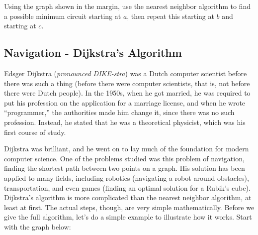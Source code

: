 \begin{trynolabel}
Using the graph shown in the margin, use the nearest neighbor algorithm to find a possible minimum circuit starting at $a$, then repeat this starting at $b$ and starting at $c$.
\end{trynolabel}
\pagebreak

\subsection{Navigation - Dijkstra's Algorithm}
Edsger Dijkstra (\emph{pronounced DIKE-stra}) was a Dutch computer scientist before there was such a thing (before there were computer scientists, that is, not before there were Dutch people).  In the 1950s, when he got married, he was required to put his profession on the application for a marriage license, and when he wrote ``programmer,'' the authorities made him change it, since there was no such profession.  Instead, he stated that he was a theoretical physicist, which was his first course of study.

Dijkstra was brilliant, and he went on to lay much of the foundation for modern computer science.  One of the problems studied was this problem of navigation, finding the shortest path between two points on a graph.  His solution has been applied to many fields, including robotics (navigating a robot around obstacles), transportation, and even games (finding an optimal solution for a Rubik's cube).\\

Dijkstra's algorithm is more complicated than the nearest neighbor algorithm, at least at first.  The actual steps, though, are very simple mathematically.  Before we give the full algorithm, let's do a simple example to illustrate how it works.  Start with the graph below:
\begin{center}
\end{center}

